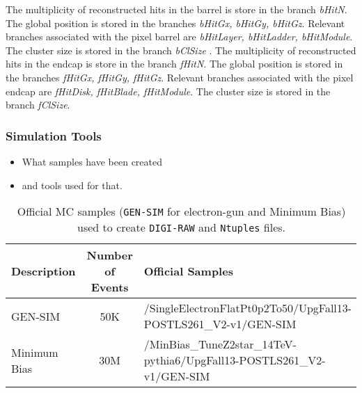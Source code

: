\documentclass[a4paper,12pt,oneside]{article}
\begin{document}
\begin{itemize}
                    The multiplicity of reconstructed hits in the barrel is store in the
                     branch {\it bHitN}. The global position is stored in the branches {\it bHitGx, bHitGy, bHitGz}. Relevant
                     branches associated with the pixel barrel are {\it bHitLayer, bHitLadder, bHitModule}. 
                     The cluster size is stored in the branch {\it bClSize} . \newline
                     \noindent The multiplicity of reconstructed hits in the endcap is store in the branch {\it fHitN}. The global position is stored in the
                     branches {\it fHitGx, fHitGy, fHitGz}. Relevant branches associated with the pixel endcap are
                     {\it fHitDisk, fHitBlade, fHitModule}. The cluster size is stored in the branch {\it fClSize}. 
                   \end{itemize}


                   \subsubsection{Simulation Tools}

                   \begin{itemize}
                   \item What samples have been created
                   \item and tools used for that.
                   \end{itemize}
                   
                   


                   \begin{table}[!htb]
                     \centering
\scriptsize
                     \caption{Official MC samples (\texttt{GEN-SIM} for electron-gun and Minimum Bias) used to create \texttt{DIGI-RAW}
                       and \texttt{Ntuples} files.}
                     \label{}
                     \begin{tabular}{lcl}
\hline
{\bf Description} & {\bf Number of Events} & {\bf Official Samples} \\ \hline \hline
GEN-SIM           & 50K                    & /SingleElectronFlatPt0p2To50/UpgFall13-POSTLS261\_V2-v1/GEN-SIM \\ \hline
Minimum Bias      & 30M                    & /MinBias\_TuneZ2star\_14TeV-pythia6/UpgFall13-POSTLS261\_V2-v1/GEN-SIM \\ \hline
                     \end{tabular}
                   \end{table}
\end{document}
